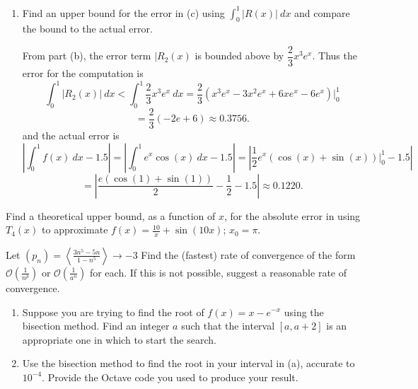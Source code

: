 \documentclass{article}
\theoremstyle{plain} %
\numberwithin{thm}{section} %
\theoremstyle{definition}
\begin{document}
\begin{question}{3}
\begin{enumerate}[label=(\alph*)]
            \item Find an upper bound for the error in (c) using \(\int _0^1 |R(x)|\ dx\) and compare the bound to the actual error.
            
            From part (b), the error term \(|R_2(x)\) is bounded above by \(\dfrac{2}{3}x^3 e^x\). Thus the error for the computation is
            \[
                \int _0^1 |R_2(x)|\ dx < \int _0^1 \dfrac{2}{3}x^3 e^x\ dx = \frac{2}{3}\left( x^3e^x - 3x^2e^x + 6xe^x - 6e^x \right) \Big|_0^1
            \]
            \[
                = \frac{2}{3}(-2e + 6) \approx 0.3756.
            \]
            and the actual error is
            \[
                \left\vert \int _0^1 f(x)\ dx - 1.5 \right\vert = \left\vert \int _0^1 e^x \cos (x)\ dx - 1.5 \right\vert = \left\vert \frac{1}{2}e^x(\cos (x) + \sin (x))\Big|_0^1 - 1.5 \right\vert
            \]
            \[
                = \left\vert \frac{e(\cos (1) + \sin (1))}{2} - \frac{1}{2} - 1.5 \right\vert \approx 0.1220.
            \]
        \end{enumerate}
    \end{question}
    \newpage
    \begin{question}{4}
        Find a theoretical upper bound, as a function of \(x\), for the absolute error in using \(T_4(x)\) to approximate \(f(x) = \frac{10}{x} + \sin(10x)\); \(x_0 = \pi\).
    \end{question}
    \newpage
    \begin{question}{5}
        Let \((p_n) = \left\langle \frac{3n^5 - 5n}{1 - n^5} \right\rangle \to -3\) Find the (fastest) rate of convergence of the form \(\mathcal{O}\left(\frac{1}{n^p}\right)\) or \(\mathcal{O}\left(\frac{1}{a^n}\right)\) for each. If this is not possible, suggest a reasonable rate of convergence.
    \end{question}
    \newpage
    \begin{question}{6}
        \begin{enumerate}[label=(\alph*)]
            \item Suppose you are trying to find the root of \(f(x) = x - e^{-x}\) using the bisection method. Find an integer \(a\) such that the interval \([a, a+2]\) is an appropriate one in which to start the search.
            \item Use the bisection method to find the root in your interval in (a), accurate to \(10^{-4}\). Provide the Octave code you used to produce your result.
        \end{enumerate}
    \end{question}
\end{document}
